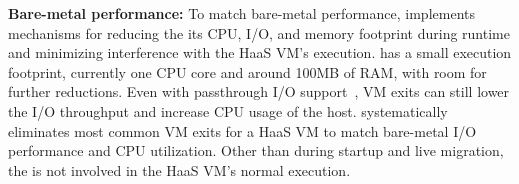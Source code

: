 {\bf Bare-metal performance:}  
To match bare-metal performance, \na implements mechanisms
for reducing the its CPU, I/O, and memory footprint
during runtime and minimizing interference with the HaaS VM's execution.
\na has a small execution footprint, currently one 
CPU core and around 100MB of RAM, with room for further reductions.
Even with passthrough I/O support~\cite{intelvtd-paper,intelvtd-manual}, 
VM exits can still lower the I/O throughput and increase CPU usage of the host.
\na systematically eliminates
most common VM exits for a HaaS VM to match bare-metal I/O performance and CPU utilization.
Other than during startup and live migration, the \na is not involved in the
HaaS VM's normal execution.


